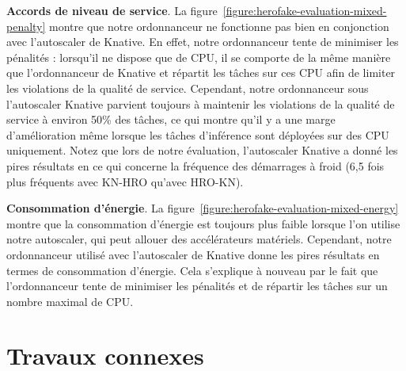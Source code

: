 \textbf{Accords de niveau de service}. La figure~\ref{figure:herofake-evaluation-mixed-penalty} montre que notre ordonnanceur ne fonctionne pas bien en conjonction avec l'autoscaler de Knative. En effet, notre ordonnanceur tente de minimiser les pénalités : lorsqu'il ne dispose que de CPU, il se comporte de la même manière que l'ordonnanceur de Knative et répartit les tâches sur ces CPU afin de limiter les violations de la qualité de service. Cependant, notre ordonnanceur sous l'autoscaler Knative parvient toujours à maintenir les violations de la qualité de service à environ 50\% des tâches, ce qui montre qu'il y a une marge d'amélioration même lorsque les tâches d'inférence sont déployées sur des CPU uniquement. Notez que lors de notre évaluation, l'autoscaler Knative a donné les pires résultats en ce qui concerne la fréquence des démarrages à froid (6,5 fois plus fréquents avec KN-HRO qu'avec HRO-KN).

\textbf{Consommation d'énergie}. La figure~\ref{figure:herofake-evaluation-mixed-energy} montre que la consommation d'énergie est toujours plus faible lorsque l'on utilise notre autoscaler, qui peut allouer des accélérateurs matériels. Cependant, notre ordonnanceur utilisé avec l'autoscaler de Knative donne les pires résultats en termes de consommation d'énergie. Cela s'explique à nouveau par le fait que l'ordonnanceur tente de minimiser les pénalités et de répartir les tâches sur un nombre maximal de CPU.

\section{Travaux connexes}
\label{section:herofake-sota}

